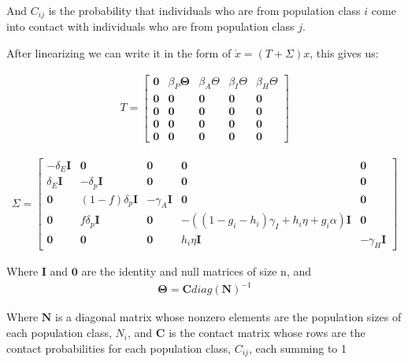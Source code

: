 \documentclass{article}
\begin{document}
And $C_{ij}$ is the probability that individuals who are from population class $i$ come into contact with individuals who are from population class $j$.

\noindent
After linearizing we can write it in the form of $\dot{x} = (T + \Sigma) x$, this gives us:

\begin{gather}
 T =
  \begin{bmatrix}
   \boldsymbol{0} & \beta_P \boldsymbol{\Theta} & 
   \beta_A {\Theta} &
   \beta_I {\Theta} &
   \beta_H {\Theta} \\
   \boldsymbol{0} & \boldsymbol{0} & \boldsymbol{0} & \boldsymbol{0} & \boldsymbol{0} \\
   \boldsymbol{0} & \boldsymbol{0} & \boldsymbol{0} & \boldsymbol{0} & \boldsymbol{0} \\
   \boldsymbol{0} & \boldsymbol{0} & \boldsymbol{0} & \boldsymbol{0} & \boldsymbol{0} \\
   \boldsymbol{0} & \boldsymbol{0} & \boldsymbol{0} & \boldsymbol{0} & \boldsymbol{0}
   \end{bmatrix}
\end{gather}

\begin{gather}
 \Sigma =
  \begin{bmatrix}
   - \delta_E \boldsymbol{I} & \boldsymbol{0} & \boldsymbol{0} & \boldsymbol{0} & \boldsymbol{0} \\
   \delta_E \boldsymbol{I}& -\delta_p \boldsymbol{I} & \boldsymbol{0} & \boldsymbol{0} & \boldsymbol{0} \\
   \boldsymbol{0} & (1-f) \delta_p \boldsymbol{I} & -\gamma_A \boldsymbol{I} & \boldsymbol{0} & \boldsymbol{0} \\
   \boldsymbol{0} & f \delta_p \boldsymbol{I} & \boldsymbol{0} & - ((1-g_i-h_i) \gamma_{I} + h_i \eta + g_i \alpha) \boldsymbol{I} & \boldsymbol{0} \\
   \boldsymbol{0} & \boldsymbol{0} & \boldsymbol{0} & h_i \eta \boldsymbol{I} & -\gamma_H \boldsymbol{I}
   \end{bmatrix}
\end{gather}

Where $\boldsymbol{I}$ and $\boldsymbol{0}$ are the identity and null matrices of size n, and 
\begin{gather*}
   \boldsymbol{\Theta} = \boldsymbol{C} diag(\boldsymbol{N})^{-1}
\end{gather*}

Where $\boldsymbol{N}$ is a diagonal matrix whose nonzero elements are the population sizes of each population class, $N_i$, and $\boldsymbol{C}$ is the contact matrix whose rows are the contact probabilities for each population class, $C_{ij}$, each summing to 1
\end{document}
